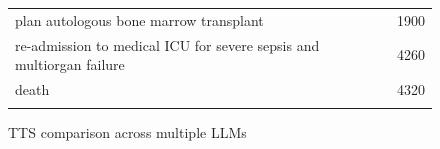 \begin{figure}[!htbp]
\begin{minipage}[!htbp]{0.49\textwidth}
\begin{tabular}{P{0.75\textwidth}r}
            plan autologous bone marrow transplant & 1900 \\  
            re-admission to medical ICU for severe sepsis and multiorgan failure & 4260 \\
            death & 4320 \\
            & 
        \end{tabular}
    \end{minipage}
    \caption{TTS comparison across multiple LLMs}
    \label{fig:compare_LLM_annotations}
\end{figure}


